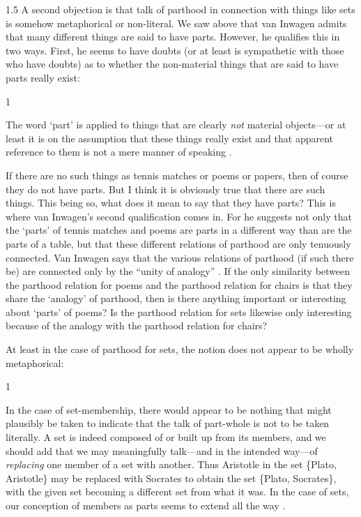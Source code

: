 \documentclass[11pt]{article}
\newenvironment{squote}{%
\begin{spacing}{1}
\begin{list}{}{%
\setlength{\labelwidth}{0pt}%
\rightmargin\leftmargin%
}
\item\relax
}{%
\end{list}%
\end{spacing}
}
\begin{document}
\begin{spacing}{1.5}
A second objection is that talk of parthood in connection with things
like sets is somehow metaphorical or non-literal.  We saw above that
van Inwagen admits that many different things are said to have parts.
However, he qualifies this in two ways.  First, he seems to have
doubts (or at least is sympathetic with those who have doubts) as to
whether the non-material things that are said to have parts really
exist:

\begin{squote}
The word `part' is applied to things that are clearly \emph{not}
material objects---or at least it is on the assumption that these
things really exist and that apparent reference to them is not a mere
manner of speaking \citep[19]{inwagen1995}.
\end{squote}

If there are no such things as tennis matches or poems or papers, then
of course they do not have parts.  But I think it is obviously true
that there are such things.  This being so, what does it mean to say
that they have parts?  This is where van Inwagen's second
qualification comes in.  For he suggests not only that the `parts' of
tennis matches and poems are parts in a different way than are the
parts of a table, but that these different relations of parthood are
only tenuously connected.  Van Inwagen says that the various relations
of parthood (if such there be) are connected only by the ``unity of
analogy'' \citeyearpar[19]{inwagen1995}.  If the only similarity
between the parthood relation for poems and the parthood relation for
chairs is that they share the `analogy' of parthood, then is there
anything important or interesting about `parts' of poems?  Is the
parthood relation for sets likewise only interesting because of the
analogy with the parthood relation for chairs?

At least in the case of parthood for sets, the notion does not appear
to be wholly metaphorical:

\begin{squote}
In the case of set-membership, there would appear to be nothing that
might plausibly be taken to indicate that the talk of part-whole is
not to be taken literally. A set is indeed composed of or built up
from its members, and we should add that we may meaningfully
talk---and in the intended way---of \emph{replacing} one member of a
set with another.  Thus Aristotle in the set \{Plato, Aristotle\} may
be replaced with Socrates to obtain the set \{Plato, Socrates\}, with
the given set becoming a different set from what it was. In the case
of sets, our conception of members as parts seems to extend all the
way \citep[564]{fine2010}.
\end{squote}


\end{spacing}
\end{document}
